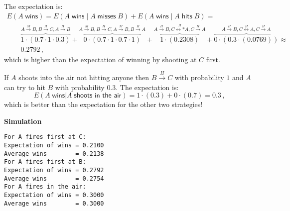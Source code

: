 The expectation is:
\vspace*{-4ex}
\[
\renewcommand*{\arraystretch}{2.5}
\begin{array}{l}
E(A \;\textsf{wins}) =E(A \;\textsf{wins}\;|\;A\;\textsf{misses}\;B) + E(A \;\textsf{wins}\;|\;A\;\textsf{hits}\;B)=\\
\qquad
\overbrace{1\cdot (0.7\cdot 1\cdot 0.3)}%
^{A\stackrel{M}{\longrightarrow}B, B\stackrel{H}{\longrightarrow}C, A\stackrel{H}{\longrightarrow}B}+

\overbrace{0\cdot (0.7\cdot 1\cdot 0.7\cdot 1)}%
^{A\stackrel{M}{\longrightarrow}B, B\stackrel{H}{\longrightarrow}C,A\stackrel{M}{\longrightarrow}B,B\stackrel{H}{\longrightarrow}A} +

\overbrace{1\cdot (0.2308)}%
^{A\stackrel{H}{\longrightarrow}B, C\stackrel{H}{\longleftrightarrow*}A,C\stackrel{H}{\longrightarrow}A} +
\overbrace{0\cdot (0.3\cdot (0.0769))}%
^{A\stackrel{H}{\longrightarrow}B, C\stackrel{H}{\longleftrightarrow}A,C\stackrel{H}{\longrightarrow}A}
\approx\\
\qquad 0.2792\,,
\end{array}
\]
which is higher than the expectation of winning by shooting at $C$ first.

 If $A$ shoots into the air not hitting anyone then $B\stackrel{H}{\longrightarrow}C$ with probability $1$ and $A$ can try to hit $B$ with probability $0.3$. The expectation is:
\[
E(A \;\textsf{wins}|A\;\textsf{shoots in the air}) = 1\cdot(0.3) + 0\cdot(0.7)=0.3\,,
\]
which is better than the expectation for the other two strategies!

\textbf{Simulation}
\begin{verbatim}
For A fires first at C:
Expectation of wins = 0.2100
Average wins        = 0.2138
For A fires first at B:
Expectation of wins = 0.2792
Average wins        = 0.2754
For A fires in the air:
Expectation of wins = 0.3000
Average wins        = 0.3000
\end{verbatim}

